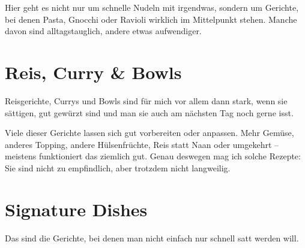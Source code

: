 \documentclass[
  a4paper,
  twoside,
  11pt
]{article}
\begin{document}
Hier geht es nicht nur um schnelle Nudeln mit irgendwas, sondern um Gerichte, bei denen Pasta, Gnocchi oder Ravioli wirklich im Mittelpunkt stehen. Manche davon sind alltagstauglich, andere etwas aufwendiger.

\mylocaltableofcontents%
\newpage












\section{Reis, Curry \& Bowls}

Reisgerichte, Currys und Bowls sind für mich vor allem dann stark, wenn sie sättigen, gut gewürzt sind und man sie auch am nächsten Tag noch gerne isst.

Viele dieser Gerichte lassen sich gut vorbereiten oder anpassen. Mehr Gemüse, anderes Topping, andere Hülsenfrüchte, Reis statt Naan oder umgekehrt -- meistens funktioniert das ziemlich gut. Genau deswegen mag ich solche Rezepte: Sie sind nicht zu empfindlich, aber trotzdem nicht langweilig.

\mylocaltableofcontents%
\newpage







\section{Signature Dishes}

Das sind die Gerichte, bei denen man nicht einfach nur schnell satt werden will.
\end{document}
